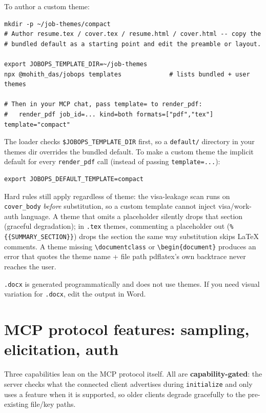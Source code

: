 \documentclass[11pt,letterpaper]{article}
\newcommand{\tool}[1]{\texttt{#1}}
\newcommand{\fpath}[1]{\texttt{#1}}
\begin{document}
To author a custom theme:

\begin{lstlisting}[language=bashplus]
mkdir -p ~/job-themes/compact
# Author resume.tex / cover.tex / resume.html / cover.html -- copy the
# bundled default as a starting point and edit the preamble or layout.

export JOBOPS_TEMPLATE_DIR=~/job-themes
npx @mohith_das/jobops templates             # lists bundled + user themes

# Then in your MCP chat, pass template= to render_pdf:
#   render_pdf job_id=... kind=both formats=["pdf","tex"] template="compact"
\end{lstlisting}

The loader checks \texttt{\$JOBOPS\_TEMPLATE\_DIR} first, so a \fpath{default/} directory in your themes dir overrides the bundled default. To make a custom theme the implicit default for every \tool{render\_pdf} call (instead of passing \texttt{template=...}):

\begin{lstlisting}[language=bashplus]
export JOBOPS_DEFAULT_TEMPLATE=compact
\end{lstlisting}

Hard rules still apply regardless of theme: the visa-leakage scan runs on \texttt{cover\_body} \emph{before} substitution, so a custom template cannot inject visa/work-auth language. A theme that omits a placeholder silently drops that section (graceful degradation); in \fpath{.tex} themes, commenting a placeholder out (\texttt{\% \{\{SUMMARY\_SECTION\}\}}) drops the section the same way \textemdash{} substitution skips LaTeX comments. A theme missing \verb|\documentclass| or \verb|\begin{document}| produces an error that quotes the theme name + file path \textemdash{} pdflatex's own backtrace never reaches the user.

\fpath{.docx} is generated programmatically and does not use themes. If you need visual variation for \fpath{.docx}, edit the output in Word.

\section{MCP protocol features: sampling, elicitation, auth}\label{sec:mcp-features}

Three capabilities lean on the MCP protocol itself. All are \textbf{capability-gated}: the server checks what the connected client advertises during \texttt{initialize} and only uses a feature when it is supported, so older clients degrade gracefully to the pre-existing file/key paths.
\end{document}
